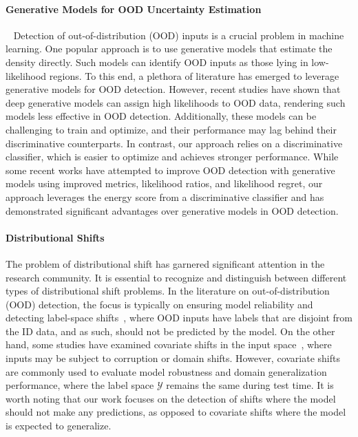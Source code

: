 \documentclass{article}
\begin{document}
\vspace{-0.2cm}
\paragraph{Generative Models for OOD Uncertainty Estimation}~
Detection of out-of-distribution (OOD) inputs is a crucial problem in machine learning. One popular approach is to use generative models that estimate the density directly. Such models can identify OOD inputs as those lying in low-likelihood regions. To this end, a plethora of literature has emerged to leverage generative models for OOD detection. However, recent studies have shown that deep generative models can assign high likelihoods to OOD data, rendering such models less effective in OOD detection. Additionally, these models can be challenging to train and optimize, and their performance may lag behind their discriminative counterparts. In contrast, our approach relies on a discriminative classifier, which is easier to optimize and achieves stronger performance. While some recent works have attempted to improve OOD detection with generative models using improved metrics, likelihood ratios, and likelihood regret, our approach leverages the energy score from a discriminative classifier and has demonstrated significant advantages over generative models in OOD detection.
\vspace{-0.2cm}
\paragraph{Distributional Shifts} 
The problem of distributional shift has garnered significant attention in the research community. It is essential to recognize and distinguish between different types of distributional shift problems. In the literature on out-of-distribution (OOD) detection, the focus is typically on ensuring model reliability and detecting label-space shifts~\cite{hendrycks17baseline, liang2018enhancing, liu2020energy}, where OOD inputs have labels that are disjoint from the ID data, and as such, should not be predicted by the model. On the other hand, some studies have examined covariate shifts in the input space~\cite{hendrycks2019benchmarking, malinin2021shifts, ovadia2019can}, where inputs may be subject to corruption or domain shifts. However, covariate shifts are commonly used to evaluate model robustness and domain generalization performance, where the label space $\mathcal{Y}$ remains the same during test time. It is worth noting that our work focuses on the detection of shifts where the model should not make any predictions, as opposed to covariate shifts where the model is expected to generalize.
\end{document}
